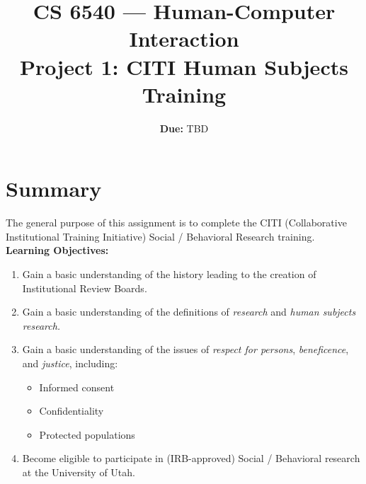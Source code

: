 \documentclass{article}
\title{CS 6540 --- Human-Computer Interaction\\\textbf{Project 1: CITI Human Subjects Training}}
\author{ }
\date{\textbf{Due:} TBD}
\begin{document}
\maketitle

\section{Summary}
The general purpose of this assignment is to complete the CITI (Collaborative Institutional Training Initiative) Social / Behavioral Research training. \\

\textbf{Learning Objectives:}
\begin{enumerate}
    \item Gain a basic understanding of the history leading to the creation of Institutional Review Boards.
    \item Gain a basic understanding of the definitions of \textit{research} and \textit{human subjects research.}
    \item Gain a basic understanding of the issues of \textit{respect for persons}, \textit{beneficence}, and \textit{justice}, including:
    \begin{itemize}
        \item Informed consent
        \item Confidentiality
        \item Protected populations
    \end{itemize}
    \item Become eligible to participate in (IRB-approved) Social / Behavioral research at the University of Utah.
\end{enumerate}\\
\end{document}
